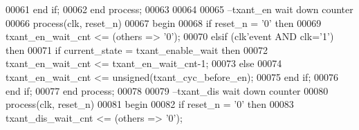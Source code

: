 \begin{DoxyCode}
00061    \textcolor{keywordflow}{end} \textcolor{keywordflow}{if};
00062 \textcolor{keywordflow}{end} \textcolor{keywordflow}{process};
00063 
00064 
00065 \textcolor{keyword}{--txant\_en wait down counter}
00066 \textcolor{keywordflow}{process}(clk, reset_n)
00067 \textcolor{vhdlkeyword}{   begin}
00068    \textcolor{keywordflow}{if} \textcolor{vhdlchar}{reset_n} \textcolor{vhdlchar}{=} \textcolor{vhdlchar}{'}\textcolor{vhdllogic}{}\textcolor{vhdllogic}{0}\textcolor{vhdlchar}{'} \textcolor{keywordflow}{then} 
00069       \textcolor{vhdlchar}{txant_en_wait_cnt} \textcolor{vhdlchar}{<=} \textcolor{vhdlchar}{(}\textcolor{keywordflow}{others} \textcolor{vhdlchar}{=}\textcolor{vhdlchar}{>} \textcolor{vhdlchar}{'}\textcolor{vhdllogic}{}\textcolor{vhdllogic}{0}\textcolor{vhdlchar}{'}\textcolor{vhdlchar}{)};
00070    \textcolor{keywordflow}{elsif} \textcolor{vhdlchar}{(}\textcolor{vhdlchar}{clk}\textcolor{vhdlchar}{'}\textcolor{vhdlkeyword}{event} \textcolor{keywordflow}{AND} \textcolor{vhdlchar}{clk}\textcolor{vhdlchar}{=}\textcolor{vhdlchar}{'}\textcolor{vhdllogic}{}\textcolor{vhdllogic}{1}\textcolor{vhdlchar}{'}\textcolor{vhdlchar}{)} \textcolor{keywordflow}{then}
00071       \textcolor{keywordflow}{if} \textcolor{vhdlchar}{current_state} \textcolor{vhdlchar}{=} \textcolor{vhdlchar}{txant\_enable\_wait} \textcolor{keywordflow}{then} 
00072          \textcolor{vhdlchar}{txant_en_wait_cnt} \textcolor{vhdlchar}{<=} \textcolor{vhdlchar}{txant_en_wait_cnt}\textcolor{vhdlchar}{-}\textcolor{vhdllogic}{}\textcolor{vhdllogic}{1};
00073       \textcolor{keywordflow}{else} 
00074          \textcolor{vhdlchar}{txant_en_wait_cnt} \textcolor{vhdlchar}{<=} \textcolor{comment}{unsigned}\textcolor{vhdlchar}{(}\textcolor{vhdlchar}{txant_cyc_before_en}\textcolor{vhdlchar}{)};
00075       \textcolor{keywordflow}{end} \textcolor{keywordflow}{if};
00076    \textcolor{keywordflow}{end} \textcolor{keywordflow}{if};
00077 \textcolor{keywordflow}{end} \textcolor{keywordflow}{process};
00078 
00079 \textcolor{keyword}{--txant\_dis wait down counter}
00080 \textcolor{keywordflow}{process}(clk, reset_n)
00081 \textcolor{vhdlkeyword}{   begin}
00082    \textcolor{keywordflow}{if} \textcolor{vhdlchar}{reset_n} \textcolor{vhdlchar}{=} \textcolor{vhdlchar}{'}\textcolor{vhdllogic}{}\textcolor{vhdllogic}{0}\textcolor{vhdlchar}{'} \textcolor{keywordflow}{then} 
00083       \textcolor{vhdlchar}{txant_dis_wait_cnt} \textcolor{vhdlchar}{<=} \textcolor{vhdlchar}{(}\textcolor{keywordflow}{others} \textcolor{vhdlchar}{=}\textcolor{vhdlchar}{>} \textcolor{vhdlchar}{'}\textcolor{vhdllogic}{}\textcolor{vhdllogic}{0}\textcolor{vhdlchar}{'}\textcolor{vhdlchar}{)};

\end{DoxyCode}
